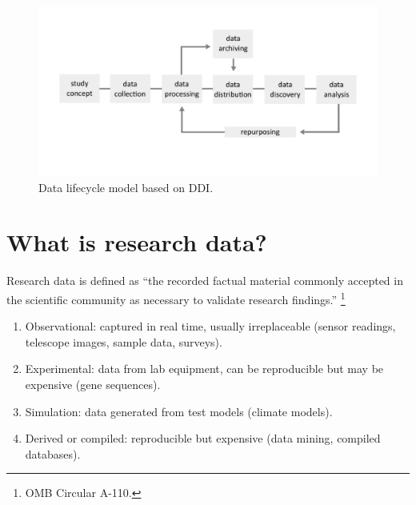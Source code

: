 \documentclass{tufte-handout}
\begin{document}
\begin{figure}
  \includegraphics{ddilifecycle.pdf}
  \caption{Data lifecycle model based on DDI.}
  \label{fig:textfig}
\end{figure}

\section{What is research data?}\label{what-is-research-data}

Research data is defined as ``the recorded factual material commonly
accepted in the scientific community as necessary to validate research
findings.'' \footnote {OMB Circular A-110.} 


\begin{enumerate}
\def\labelenumi{\arabic{enumi}.}
\itemsep1pt\parskip0pt
\item
  Observational: captured in real time, usually irreplaceable (sensor readings, telescope images, sample data, surveys).
\item
  Experimental: data from lab equipment, can be reproducible but may be expensive (gene sequences).
\item
  Simulation: data generated from test models (climate models).
\item
  Derived or compiled: reproducible but expensive (data mining, compiled databases).
\end{enumerate}
\end{document}
